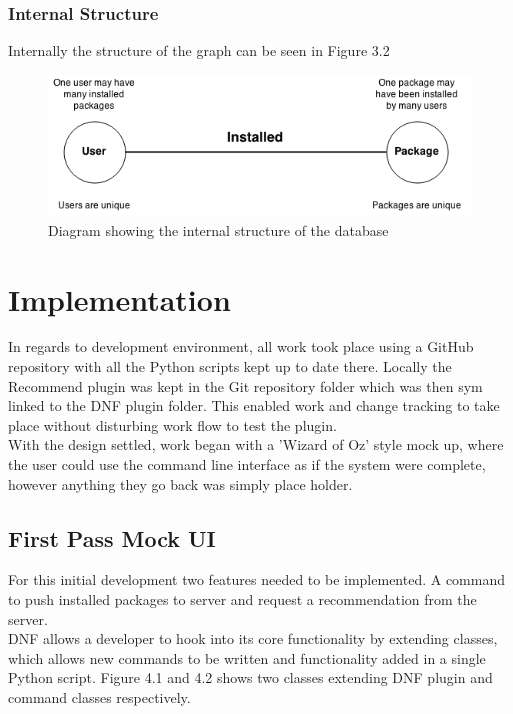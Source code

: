 \documentclass{l4proj}
\begin{document}
\subsection{Internal Structure}
Internally the structure of the graph can be seen in Figure 3.2
\begin{figure}
\includegraphics[scale=0.9]{images/recommend_graph.png}
\caption{Diagram showing the internal structure of the database}
\end{figure} 
 
\chapter{Implementation}
In regards to development environment, all work took place using a GitHub repository with all the Python scripts kept up to date there. Locally the Recommend plugin was kept in the Git repository folder which was then sym linked to the DNF plugin folder. This enabled work and change tracking to take place without disturbing work flow to test the plugin.\\
With the design settled, work began with a 'Wizard of Oz' style mock up, where the user could use the command line interface as if the system were complete, however anything they go back was simply place holder.

\section{First Pass Mock UI}
For this initial development two features needed to be implemented. A command to push installed packages to server and request a recommendation from the server.\\
DNF allows a developer to hook into its core functionality by extending classes, which allows new commands to be written and functionality added in a single Python script. Figure 4.1 and 4.2 shows two classes extending DNF plugin and command classes respectively.
\begin{figure}

\end{figure}
\begin{figure}

\end{figure}
\end{document}
